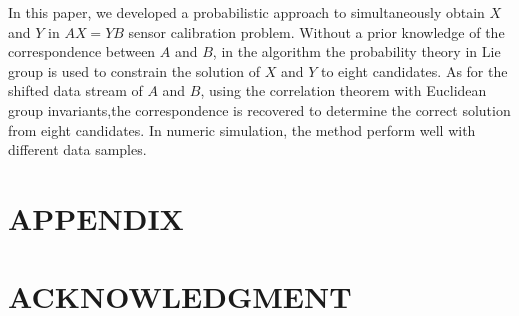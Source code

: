 \documentclass[letterpaper, 10 pt, conference]{ieeeconf}  %
\begin{document}
In this paper, we developed a probabilistic approach to simultaneously obtain  $X$ and $Y$ in $AX=YB$ sensor calibration problem. Without a prior knowledge of the correspondence between $A$ and $B$, in the algorithm the probability theory in Lie group is used to constrain the solution of $X$ and $Y$ to eight candidates. As for the shifted data stream of $A$ and $B$, using the correlation theorem with Euclidean group invariants,the correspondence is recovered to determine the correct solution from eight candidates. In numeric simulation, the method perform well with different data samples.

\addtolength{\textheight}{-12cm}   %







\section*{APPENDIX}



\section*{ACKNOWLEDGMENT}







%
%
\end{document}
